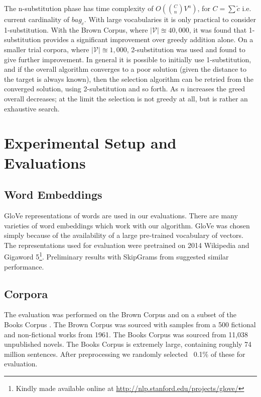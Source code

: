 \documentclass{llncs}
\renewcommand{\c}{\tilde{c}}
\newcommand{\V}{\mathcal{V}}
\begin{document}
The n-substitution phase has time complexity of $O(\binom{C}{n}V^n)$, for $C=\sum \c$ i.e. current cardinality of $bag_c$. With large vocabularies it is only practical to consider 1-substitution. With the Brown Corpus, where $|\V|\approxeq 40,000$, it was found that 1-substitution provides a significant improvement over greedy addition alone. On a smaller trial corpora, where $|\V|\approxeq 1,000$, 2-substitution was used and found to give further improvement. In general it is possible to initially use 1-substitution, and if the overall algorithm converges to a poor solution (given the distance to the target is always known), then the selection algorithm can be retried from the converged solution, using 2-substitution and so forth. As $n$ increases the greed overall decreases; at the limit the selection is not greedy at all, but is rather an exhaustive search.


\section{Experimental Setup and Evaluations} \label{evalsettings}


\subsection{Word Embeddings}
GloVe representations of words \parencite{pennington2014glove} are used in our evaluations. There are many varieties of word embeddings which work with our algorithm. GloVe was chosen simply because of the availability of a large pre-trained vocabulary of vectors. The representations used for evaluation were pretrained on 2014 Wikipedia and Gigaword 5\footnote{Kindly made available online at \url{http://nlp.stanford.edu/projects/glove/}}. Preliminary results with SkipGrams from \textcite{mikolov2013efficient} suggested similar performance.

\subsection{Corpora}

The evaluation was performed on the Brown Corpus \parencite{francis1979brown} and on a subset of the Books Corpus \parencite{moviebook}. The Brown Corpus was sourced with samples from a 500 fictional and non-fictional works from 1961. The Books Corpus was sourced from 11,038 unpublished novels. The Books Corpus is extremely large, containing roughly 74 million sentences. After preprocessing we randomly selected ~0.1\% of these for evaluation.
\end{document}
